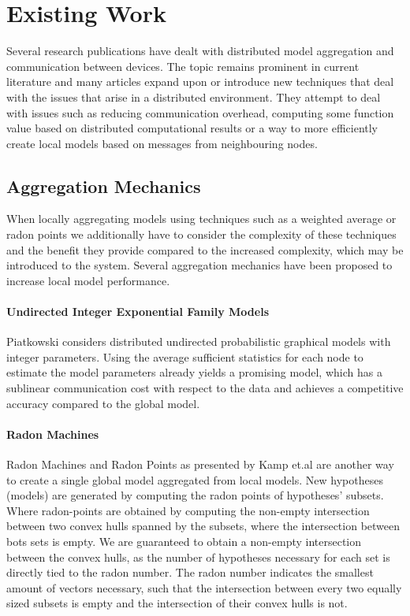     \section{Existing Work}
    \label{sec:ew}
    Several research publications have dealt with distributed model aggregation and communication between devices. 
    The topic remains prominent in current literature and many articles expand upon or introduce new techniques that deal with the issues that arise in a distributed environment.
    They attempt to deal with issues such as reducing communication overhead, computing some function value based on distributed computational results or a way to more efficiently create local models based on messages from neighbouring nodes. 

    \subsection{Aggregation Mechanics}

    When locally aggregating models using techniques such as a weighted average or radon points we additionally have to consider the complexity of these techniques and the benefit they provide compared to the increased complexity, which may be introduced to the system.
    Several aggregation mechanics have been proposed to increase local model performance.

    \paragraph{Undirected Integer Exponential Family Models}
    Piatkowski \cite{piatkowskidistributed} considers distributed undirected probabilistic graphical models with integer parameters. 
    Using the average sufficient statistics for each node to estimate the model parameters already yields a promising model, which has a sublinear communication cost with respect to the data and achieves a competitive accuracy compared to the global model.
    
    \paragraph{Radon Machines}
    Radon Machines and Radon Points as presented by Kamp et.al \cite{kamp2017effective} are another way to create a single global model aggregated from local models. New hypotheses (models) are generated by computing the radon points of hypotheses' subsets. Where radon-points are obtained by computing the non-empty intersection between two convex hulls spanned by the subsets, where the intersection between bots sets is empty.
    We are guaranteed to obtain a non-empty intersection between the convex hulls, as the number of hypotheses necessary for each set is directly tied to the radon number. 
    The radon number indicates the smallest amount of vectors necessary, such that the intersection between every two equally sized subsets is empty and the intersection of their convex hulls is not.
    
